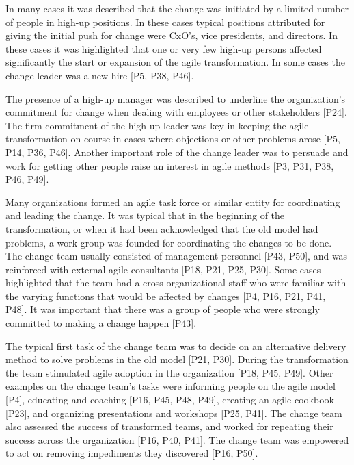 \documentclass[preprint,authoryear,12pt]{elsarticle}
\begin{document}

In many cases it was described that the change was initiated by a limited number
of people in high-up positions. In these cases typical positions attributed for
giving the initial push for change were CxO's, vice presidents, and directors.
In these cases it was highlighted that one or very few high-up persons affected
significantly the start or expansion of the agile transformation. In some cases
the change leader was a new hire [P5, P38, P46].

The presence of a high-up manager was described to underline the organization's
commitment for change when dealing with employees or other stakeholders [P24].
The firm commitment of the high-up leader was key in keeping the agile
transformation on course in cases where objections or other problems arose [P5,
P14, P36, P46]. Another important role of the change leader was to persuade and
work for getting other people raise an interest in agile methods [P3, P31, P38,
P46, P49].


Many organizations formed an agile task force or similar entity for coordinating
and leading the change. It was typical that in the beginning of the
transformation, or when it had been acknowledged that the old model had
problems, a work group was founded for coordinating the changes to be done. The
change team usually consisted of management personnel [P43, P50], and was
reinforced with external agile consultants [P18, P21, P25, P30]. Some cases
highlighted that the team had a cross organizational staff who were familiar
with the varying functions that would be affected by changes [P4, P16, P21, P41,
P48]. It was important that there was a group of people who were strongly
committed to making a change happen [P43].

The typical first task of the change team was to decide on an alternative
delivery method to solve problems in the old model [P21, P30]. During the
transformation the team stimulated agile adoption in the organization [P18, P45,
P49]. Other examples on the change team's tasks were informing people on the
agile model [P4], educating and coaching [P16, P45, P48, P49], creating an agile
cookbook [P23], and organizing presentations and workshops [P25, P41]. The
change team also assessed the success of transformed teams, and worked for
repeating their success across the organization [P16, P40, P41]. The change team
was empowered to act on removing impediments they discovered [P16, P50].
\end{document}
